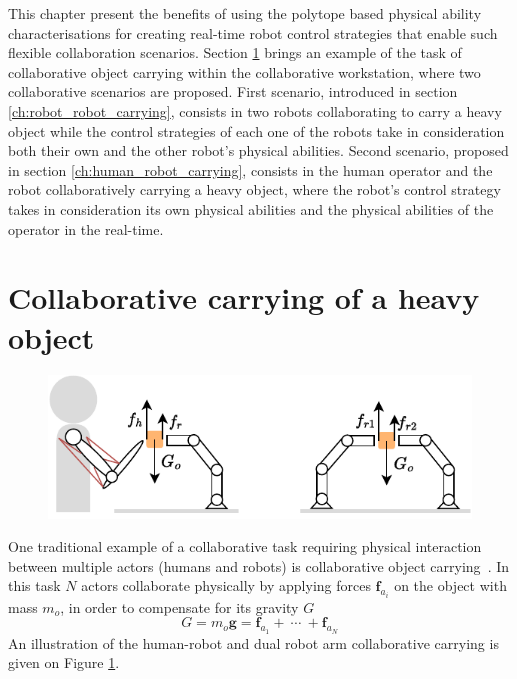
This chapter present the benefits of using the polytope based physical ability characterisations for creating real-time robot control strategies that enable such flexible collaboration scenarios. Section \ref{ch:collaborative_carrying} brings an example of the task of collaborative object carrying within the collaborative workstation, where two collaborative scenarios are proposed. First scenario, introduced in section \ref{ch:robot_robot_carrying}, consists in two robots collaborating to carry a heavy object while the control strategies of each one of the robots take in consideration both their own and the other robot's physical abilities. Second scenario, proposed in section \ref{ch:human_robot_carrying}, consists in the human operator and the robot collaboratively carrying a heavy object, where the robot's control strategy takes in consideration its own physical abilities and the physical abilities of the operator in the real-time. 


\section{Collaborative carrying of a heavy object}
\label{ch:collaborative_carrying}

\begin{figure}[!h]
    \centering
    \includegraphics[width=0.6\linewidth]{Papers/images/carrying_schema.pdf}
    \caption{}
    \label{fig:carrying_schema}
\end{figure}

One traditional example of a collaborative task requiring physical interaction between multiple actors (humans and robots) is collaborative object carrying~\cite{Arai2000carrying,Kosuge1997carrying,Tsumugiwa2002carrying}. In this task $N$ actors collaborate physically by applying forces $\bm{f}_{a_i}$ on the object with mass $m_o$, in order to compensate for its gravity $G$
\begin{equation}
    G=m_o\bm{g}=\bm{f}_{a_1} + ~\cdots ~+\bm{f}_{a_N}
\end{equation}
An illustration of the human-robot and dual robot arm collaborative carrying is given on Figure \ref{fig:carrying_schema}. 



